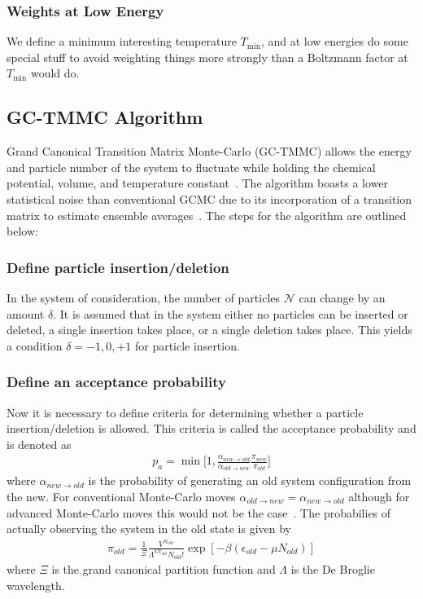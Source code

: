 \documentclass[letterpaper,twocolumn,amsmath,amssymb,pre,aps,10pt]{revtex4-1}
\begin{document}
\subsubsection{Weights at Low Energy}
We define a minimum interesting temperature $T_{\min}$, and at low
energies do some special stuff to avoid weighting things more
strongly than a Boltzmann factor at $T_{\min}$ would do.

\subsection{GC-TMMC Algorithm}
Grand Canonical Transition Matrix Monte-Carlo (GC-TMMC) allows the energy and 
particle number of the system to fluctuate while holding the chemical potential,
volume, and temperature constant~\cite{chen2001aggregation, chen2002simulating, 
errington2003direct, fenwick2006accurate, fenwick2008direct, errington2005direct}.  
The algorithm boasts a lower statistical noise than conventional GCMC due to its 
incorporation of a transition matrix to estimate ensemble averages~\cite{siderius2013use, 
paluch2008comparing, grzelak2008computation}.  The steps for the algorithm are 
outlined below:

\subsubsection{Define particle insertion/deletion}
In the system of consideration, the number of particles $\mathcal{N}$ can change
by an amount $\delta$.  It is assumed that in the system either no particles can be 
inserted or deleted, a single insertion takes place, or a single deletion takes place.
This yields a condition $\delta={-1,0,+1}$ for particle insertion.

\subsubsection{Define an acceptance probability}
Now it is necessary to define criteria for determining whether a particle insertion/deletion
is allowed.  This criteria is called the acceptance probability and is denoted as
\begin{align}
  p_{a} = \min\bigg[1,\frac{\alpha_{new\rightarrow old}}
  {\alpha_{old \rightarrow new}}\frac{\pi_{new}}{\pi_{old}}\bigg]
\end{align}
where $\alpha_{new\rightarrow old}$ is the probability of generating an old system 
configuration from the new.  For conventional Monte-Carlo moves $\alpha_{old \rightarrow new}
=\alpha_{new\rightarrow old}$ although for advanced Monte-Carlo moves this would not 
be the case~\cite{siepmann1990method}.  The probabilies of actually observing the 
system in the old state is given by
\begin{align}
  \pi_{old} = \frac{1}{\Xi}\frac{V^{N_{old}}}{\Lambda^{3N_{old}}N_{old}!}
  \exp[-\beta(\epsilon_{old}-\mu N_{old})]
\end{align}  
where $\Xi$ is the grand canonical partition function and $\Lambda$ is the De Broglie
wavelength.
\end{document}
